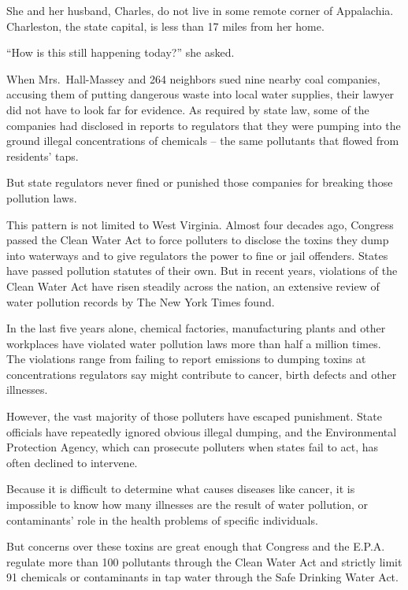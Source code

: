 ﻿\documentclass[12pt]{article}
\begin{document}
She and her husband, Charles, do not live in some remote corner of Appalachia. Charleston, the state
capital, is less than 17 miles from her home.

``How is this still happening today?'' she asked.

When Mrs.~Hall-Massey and 264 neighbors sued nine nearby coal companies, accusing them of putting
dangerous waste into local water supplies, their lawyer did not have to look far for evidence. As
required by state law, some of the companies had disclosed in reports to regulators that they were
pumping into the ground illegal concentrations of chemicals -- the same pollutants that flowed from
residents' taps.

But state regulators never fined or punished those companies for breaking those pollution laws.

This pattern is not limited to West Virginia. Almost four decades ago, Congress passed the Clean
Water Act to force polluters to disclose the toxins they dump into waterways and to give regulators
the power to fine or jail offenders. States have passed pollution statutes of their own. But in
recent years, violations of the Clean Water Act have risen steadily across the nation, an extensive
review of water pollution records by The New York Times found.

In the last five years alone, chemical factories, manufacturing plants and other workplaces have
violated water pollution laws more than half a million times. The violations range from failing to
report emissions to dumping toxins at concentrations regulators say might contribute to cancer,
birth defects and other illnesses.

However, the vast majority of those polluters have escaped punishment. State officials have
repeatedly ignored obvious illegal dumping, and the Environmental Protection Agency, which can
prosecute polluters when states fail to act, has often declined to intervene\cite{intervene}.

Because it is difficult to determine what causes diseases like cancer, it is impossible to know how
many illnesses are the result of water pollution, or contaminants' role in the health problems of
specific individuals.

But concerns over these toxins are great enough that Congress and the E.P.A. regulate more than 100
pollutants through the Clean Water Act and strictly limit 91 chemicals or
contaminants\cite{contaminant} in tap water through the Safe Drinking Water Act.
\end{document}
